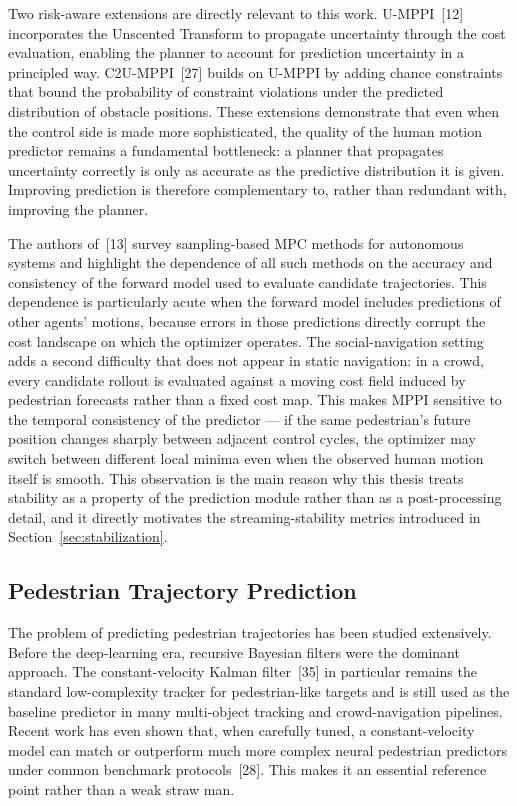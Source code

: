 \documentclass[12pt, a4paper]{article}
\begin{document}
Two risk-aware extensions are directly relevant to this work. U-MPPI~[12] incorporates the Unscented Transform to propagate uncertainty through the cost evaluation, enabling the planner to account for prediction uncertainty in a principled way. C2U-MPPI~[27] builds on U-MPPI by adding chance constraints that bound the probability of constraint violations under the predicted distribution of obstacle positions. These extensions demonstrate that even when the control side is made more sophisticated, the quality of the human motion predictor remains a fundamental bottleneck: a planner that propagates uncertainty correctly is only as accurate as the predictive distribution it is given. Improving prediction is therefore complementary to, rather than redundant with, improving the planner.

The authors of~[13] survey sampling-based MPC methods for autonomous systems and highlight the dependence of all such methods on the accuracy and consistency of the forward model used to evaluate candidate trajectories. This dependence is particularly acute when the forward model includes predictions of other agents' motions, because errors in those predictions directly corrupt the cost landscape on which the optimizer operates. The social-navigation setting adds a second difficulty that does not appear in static navigation: in a crowd, every candidate rollout is evaluated against a moving cost field induced by pedestrian forecasts rather than a fixed cost map. This makes MPPI sensitive to the temporal consistency of the predictor --- if the same pedestrian's future position changes sharply between adjacent control cycles, the optimizer may switch between different local minima even when the observed human motion itself is smooth. This observation is the main reason why this thesis treats stability as a property of the prediction module rather than as a post-processing detail, and it directly motivates the streaming-stability metrics introduced in Section~\ref{sec:stabilization}.

\subsection{Pedestrian Trajectory Prediction}

The problem of predicting pedestrian trajectories has been studied extensively. Before the deep-learning era, recursive Bayesian filters were the dominant approach. The constant-velocity Kalman filter~[35] in particular remains the standard low-complexity tracker for pedestrian-like targets and is still used as the baseline predictor in many multi-object tracking and crowd-navigation pipelines. Recent work has even shown that, when carefully tuned, a constant-velocity model can match or outperform much more complex neural pedestrian predictors under common benchmark protocols~[28]. This makes it an essential reference point rather than a weak straw man.
\end{document}
